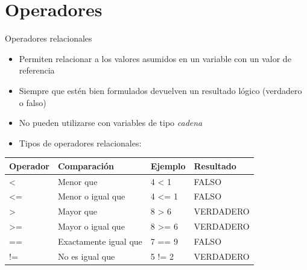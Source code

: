 \documentclass[
  spanish,
  ignorenonframetext,
]{beamer}
\providecommand{\tightlist}{%
  \setlength{\itemsep}{0pt}\setlength{\parskip}{0pt}}
\begin{document}
\hypertarget{operadores}{%
\section{Operadores}\label{operadores}}

\begin{frame}{Operadores relacionales}
\protect\hypertarget{operadores-relacionales}{}
\begin{itemize}
\tightlist
\item
  Permiten relacionar a los valores asumidos en un variable con un valor
  de referencia\\
\item
  Siempre que estén bien formulados devuelven un resultado lógico
  (verdadero o falso)\\
\item
  No pueden utilizarse con variables de tipo \emph{cadena}\\
\item
  Tipos de operadores relacionales:
\end{itemize}

\begin{longtable}[]{@{}llll@{}}
\toprule
Operador & Comparación & Ejemplo & Resultado \\
\midrule
\endhead
\textless{} & Menor que & 4 \textless{} 1 & FALSO \\
\textless= & Menor o igual que & 4 \textless= 1 & FALSO \\
\textgreater{} & Mayor que & 8 \textgreater{} 6 & VERDADERO \\
\textgreater= & Mayor o igual que & 8 \textgreater= 6 & VERDADERO \\
== & Exactamente igual que & 7 == 9 & FALSO \\
!= & No es igual que & 5 != 2 & VERDADERO \\
\bottomrule
\end{longtable}
\end{frame}
\end{document}
